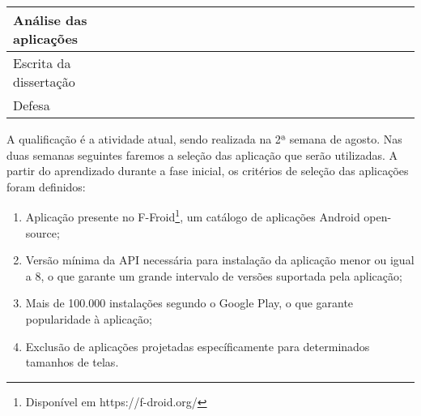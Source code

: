 \begin{table}[ht]
\begin{tabular}{|l|l|l|l|l|l|l|l|l|l|l|l|l|l|l|l|l|l|l|l|l|l|l|l|l|}
Análise das aplicações &  &                          &                          &                          & \cellcolor[HTML]{C0C0C0} & \cellcolor[HTML]{C0C0C0} & \cellcolor[HTML]{C0C0C0} & \cellcolor[HTML]{C0C0C0} & \cellcolor[HTML]{C0C0C0} & \cellcolor[HTML]{C0C0C0} & \cellcolor[HTML]{C0C0C0} & \cellcolor[HTML]{C0C0C0} &                          &                          &                          &                          &                          &                          &                          &                          &   &   &   &                           \\ \hline
Escrita da dissertação &  &                          &                          &                          &                          &                          &                          &                          &                          &                          &                          &                          & \cellcolor[HTML]{C0C0C0} & \cellcolor[HTML]{C0C0C0} & \cellcolor[HTML]{C0C0C0} & \cellcolor[HTML]{C0C0C0} & \cellcolor[HTML]{C0C0C0} & \cellcolor[HTML]{C0C0C0} & \cellcolor[HTML]{C0C0C0} & \cellcolor[HTML]{C0C0C0} &   &   &   &                           \\ \hline
Defesa                 &  &                          &                          &                          &                          &                          &                          &                          &                          &                          &                          &                          &                          &                          &                          &                          &                          &                          &                          &                          &   &   &   & \cellcolor[HTML]{C0C0C0}  \\ \hline
\end{tabular}
\end{table}


A qualificação é a atividade atual, sendo realizada na 2ª semana de agosto.
Nas duas semanas seguintes faremos a seleção das aplicação que serão utilizadas.
A partir do aprendizado durante a fase inicial, os critérios de seleção das
aplicações foram definidos:
\begin{enumerate}
    \item Aplicação presente no F-Froid\footnote{Disponível em https://f-droid.org/},
        um catálogo de aplicações Android open-source;
    \item Versão mínima da API necessária para instalação da aplicação menor ou
        igual a 8,
        o que garante um grande intervalo de versões suportada pela aplicação;
    \item Mais de 100.000 instalações segundo o Google Play, o que garante
        popularidade à aplicação;
    \item Exclusão de aplicações projetadas específicamente para determinados
        tamanhos de telas.
\end{enumerate}

